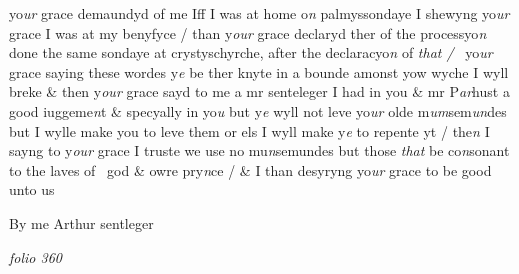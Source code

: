 \documentclass[12pt, a4paper]{book}
\begin{document}
		\ifthenelse{\isodd{\thepage}}
		{\reversemarginpar}
		{\normalmarginpar}
		yo\textit{ur} grace demaundyd of me Iff I was at home o\textit{n} 
palmyssondaye I shewyng yo\textit{ur} grace I was at my benyfyce / than y\textit{our} grace declaryd ther of the processyo\textit{n}
done the same sondaye at crystyschyrche, after the 
declaracyo\textit{n} of \textit{that /}  yo\textit{ur} grace saying these wordes y\textit{e} be
ther knyte in a bounde amonst yow wyche I wyll breke \&
then y\textit{our} grace sayd to me a mr senteleger I had in you
\& mr P\textit{ar}hust a good iuggeme\textit{n}t \& specyally in yo\textit{u} but
y\textit{e} wyll not leve yo\textit{ur} olde m\textit{um}sem\textit{un}des but I wylle
make you to leve them or els I wyll make y\textit{e} to repente
yt / the\textit{n} I sayng to y\textit{our} grace I truste we use no 
mu\textit{n}semundes but those \textit{that} be co\textit{n}sonant to the laves of 
god \& owre pry\textit{n}ce / \& I than
			 desyryng yo\textit{ur} grace to be good 
unto us

		\ifthenelse{\isodd{\thepage}}
		{\reversemarginpar}
		{\normalmarginpar}
		By me Arthur
sentleger

\dotfill
						\newpage
{}

\textit{folio 360}



         
\dotfill
						\newpage
			
			
			
			
			
			
			
			
\end{document}

